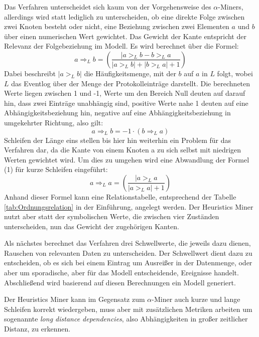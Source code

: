 Das Verfahren unterscheidet sich kaum von der Vorgehensweise des $\alpha$-Miners, allerdings wird statt lediglich zu unterscheiden, ob eine direkte Folge zwischen zwei Knoten besteht oder nicht, eine Beziehung zwischen zwei Elementen $a$ und $b$ über einen numerischen Wert gewichtet. Das Gewicht der Kante entspricht der Relevanz der Folgebeziehung im Modell. Es wird berechnet über die Formel: 
\begin{equation}
 {a} \Rightarrow _L {b} = \left(\frac{ | {a} >_L {b} - {b} >_L {a} }{|{a} >_L {b}| + |{b} >_L {a}| + 1 }\right)
 \end{equation}
 Dabei beschreibt $|{a} >_L {b}|$ die Häufigkeitsmenge, mit der $b$ auf $a$ in $L$ folgt, wobei $L$ das Eventlog über der Menge der Protokolleinträge darstellt. Die berechneten Werte liegen zwischen 1 und -1, Werte um den Bereich Null deuten auf darauf hin, dass zwei Einträge unabhängig sind, positive Werte nahe 1 deuten auf eine Abhängigkeitsbeziehung hin, negative auf eine Abhängigkeitsbeziehung in umgekehrter Richtung, also gilt:
 \begin{equation}
 {a} \Rightarrow _L {b} =  -1 \cdot ( {b} \Rightarrow _L{a} )
 \end{equation}
Schleifen der Länge eins stellen bis hier hin weiterhin ein Problem für das Verfahren dar, da die Kante von einem Knoten a zu sich selbst mit niedrigen Werten gewichtet wird. Um dies zu umgehen wird eine Abwandlung der Formel (1) für kurze Schleifen eingeführt:
 \begin{equation}
 {a} \Rightarrow _L {a} = \left(\frac{ | {a} >_L {a}}{
|{a} >_L {a}| + 1 }\right)
 \end{equation}
Anhand dieser Formel kann eine Relationstabelle, entsprechend der Tabelle \ref{tab:Ordnungsrelation} in der Einführung, angelegt werden. Der Heuristics Miner nutzt aber statt der symbolischen Werte, die zwischen vier Zuständen unterscheiden, nun das Gewicht der zugehörigen Kanten. 

Als nächstes berechnet das Verfahren drei Schwellwerte, die jeweils dazu dienen, Rauschen von relevanten Daten zu unterscheiden. Der Schwellwert dient dazu zu entscheiden, ob es sich bei einem Eintrag um Ausreißer in der Datenmenge, oder aber um sporadische, aber für das Modell entscheidende, Ereignisse handelt. Abschließend wird basierend auf diesen Berechnungen ein Modell generiert.

Der Heuristics Miner kann im Gegensatz zum $\alpha$-Miner auch kurze und lange Schleifen korrekt wiedergeben, muss aber mit zusätzlichen Metriken arbeiten um sogenannte\textit{ long distance dependencies}, also Abhängigkeiten in großer zeitlicher Distanz, zu erkennen.

